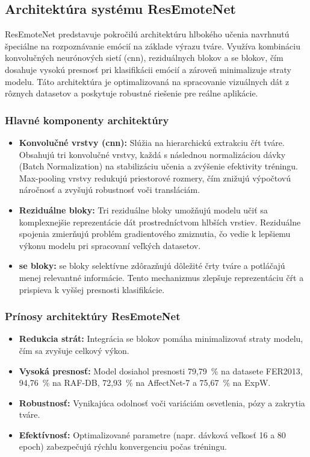 \subsection{Architektúra systému ResEmoteNet}

ResEmoteNet predstavuje pokročilú architektúru hlbokého učenia navrhnutú špeciálne na rozpoznávanie emócií na základe výrazu tváre. Využíva kombináciu konvolučných neurónových sietí (\gls{cnn}), reziduálnych blokov a \gls{se} blokov, čím dosahuje vysokú presnosť pri klasifikácii emócií a zároveň minimalizuje straty modelu. Táto architektúra je optimalizovaná na spracovanie vizuálnych dát z rôznych datasetov a poskytuje robustné riešenie pre reálne aplikácie.

\subsubsection{Hlavné komponenty architektúry}

\begin{itemize}
    \item \textbf{Konvolučné vrstvy (\gls{cnn}):} 
    Slúžia na hierarchickú extrakciu čŕt tváre. Obsahujú tri konvolučné vrstvy, každá s následnou normalizáciou dávky (Batch Normalization) na stabilizáciu učenia a zvýšenie efektivity tréningu. Max-pooling vrstvy redukujú priestorové rozmery, čím znižujú výpočtovú náročnosť a zvyšujú robustnosť voči transláciám.
    
    \item \textbf{Reziduálne bloky:} 
    Tri reziduálne bloky umožňujú modelu učiť sa komplexnejšie reprezentácie dát prostredníctvom hlbších vrstiev. Reziduálne spojenia zmierňujú problém gradientového zmiznutia, čo vedie k lepšiemu výkonu modelu pri spracovaní veľkých datasetov.
    
    \item \textbf{\gls{se} bloky:} 
    \gls{se} bloky selektívne zdôrazňujú dôležité črty tváre a potláčajú menej relevantné informácie. Tento mechanizmus zlepšuje reprezentáciu čŕt a prispieva k vyššej presnosti klasifikácie.
\end{itemize}

\subsubsection{Prínosy architektúry ResEmoteNet}

\begin{itemize}
    \item \textbf{Redukcia strát:} Integrácia \gls{se} blokov pomáha minimalizovať straty modelu, čím sa zvyšuje celkový výkon.
    \item \textbf{Vysoká presnosť:} Model dosiahol presnosti 79,79~\% na datasete FER2013, 94,76~\% na RAF-DB, 72,93~\% na AffectNet-7 a 75,67~\% na ExpW.
    \item \textbf{Robustnosť:} Vynikajúca odolnosť voči variáciám osvetlenia, pózy a zakrytia tváre.
    \item \textbf{Efektívnosť:} Optimalizované parametre (napr. dávková veľkosť 16 a 80 epoch) zabezpečujú rýchlu konvergenciu počas tréningu.
\end{itemize}

